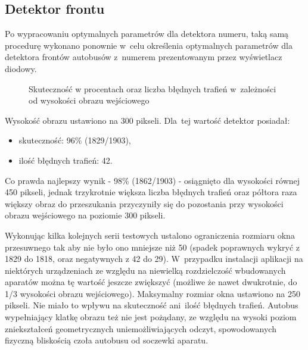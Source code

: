 \subsection{Detektor frontu}

Po wypracowaniu optymalnych parametrów dla detektora numeru,
taką samą procedurę wykonano ponownie w~celu określenia
optymalnych parametrów dla detektora frontów autobusów 
z~numerem prezentowanym przez wyświetlacz diodowy.


\begin{figure}[h!]
\begin{center}
\end{center}
\caption{Skuteczność w procentach oraz liczba błędnych trafień
w~zależności od wysokości obrazu wejściowego}
\label{chart:img_height2hitratio}
\end{figure}

Wysokość obrazu ustawiono na 300 pikseli. Dla~tej wartość
detektor posiadał:
\begin{itemize}
    \item skuteczność: 96\% (1829/1903),
    \item ilość błędnych trafień: 42.
\end{itemize}

Co prawda najlepszy wynik - 98\% (1862/1903) - osiągnięto dla wysokości
równej 450 pikseli, jednak trzykrotnie większa liczba błędnych
trafień oraz półtora raza większy obraz do przeszukania
przyczyniły się do pozostania przy wysokości obrazu 
wejściowego na poziomie 300 pikseli.

Wykonując kilka kolejnych serii testowych ustalono ograniczenia
rozmiaru okna przesuwnego tak aby nie było ono mniejsze niż 50
(spadek poprawnych wykryć z 1829 do 1818, oraz negatywnych 
z 42 do 29). W~przypadku instalacji aplikacji na niektórych 
urządzeniach
ze względu na niewielką rozdzielczość wbudowanych aparatów
można tę wartość jeszcze zwiększyć (możliwe że nawet dwukrotnie,
do 1/3 wysokości obrazu wejściowego). Maksymalny rozmiar
okna ustawiono na 250 pikseli.
Nie miało to wpływu na skuteczność ani~ilość błędnych
trafień. Autobus wypełniający klatkę obrazu też nie jest 
pożądany, ze względu na wysoki poziom zniekształceń geometrycznych
uniemożliwiających odczyt, spowodowanych fizyczną bliskością
czoła autobusu od soczewki aparatu.

